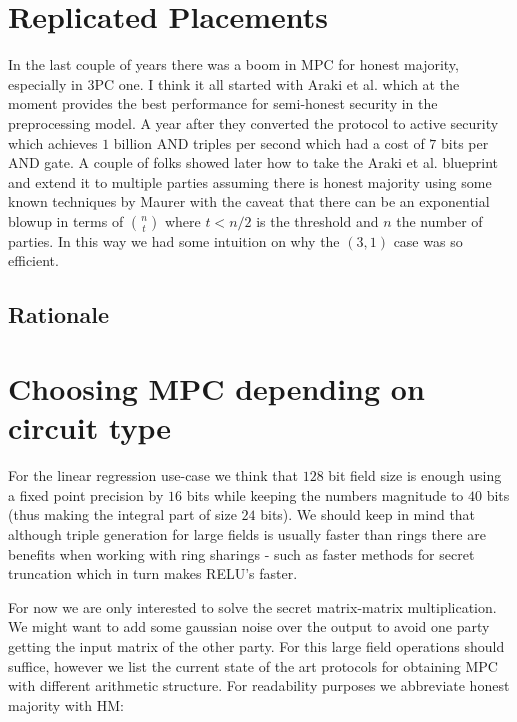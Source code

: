 \section{Replicated Placements}

In the last couple of years there was a boom in MPC for honest majority,
especially in 3PC one. I think it all started with Araki et al.
\cite{CCS:AFLNO16} which at the moment provides the best performance for
semi-honest security in the preprocessing model. A year after they converted
the protocol to active security which achieves $1$ billion AND triples per
second \cite{SP:ABFLLN17} which had a cost of $7$ bits per AND gate. A couple
of folks showed later how to take the Araki et al. \cite{CCS:AFLNO16}
blueprint and extend it to multiple parties assuming there is honest majority
\cite{SCN:KRSW18} using some known techniques by Maurer \cite{SCN:Maurer02}
with the caveat that there can be an exponential blowup in terms of $n
\choose t$ where $t<n/2$ is the threshold and $n$ the number of parties. In
this way we had some intuition on why the $(3,1)$ case was so efficient.


\subsection{Rationale}
\section{Choosing MPC depending on circuit type} For the linear regression use-case
we think that $128$ bit field size is enough using a fixed point precision by
$16$ bits while keeping the numbers magnitude to $40$ bits (thus making the
integral part of size $24$ bits). We should keep in mind that although triple
generation for large fields is usually faster than rings there are benefits
when working with ring sharings - such as faster methods for secret
truncation which in turn makes RELU's faster.

For now we are only interested to solve the secret matrix-matrix
multiplication. We might want to add some gaussian noise over the output to
avoid one party getting the input matrix of the other party. For this large
field operations should suffice, however we list the current state of the art
protocols for obtaining MPC with different arithmetic structure. For
readability purposes we abbreviate honest majority with HM:

